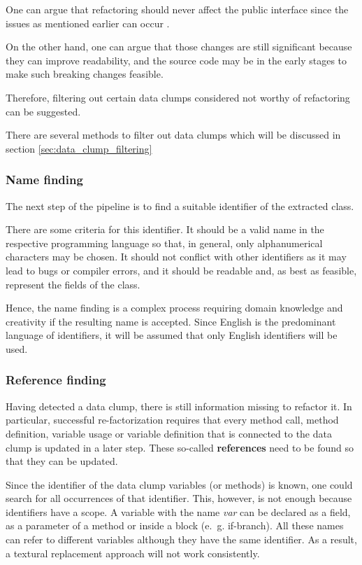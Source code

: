 One can argue that refactoring should never affect the public interface since the issues as mentioned earlier can occur \cite{10.1145/1352678.1352681}.

On the other hand, one can argue that those changes are still significant because they can improve readability, and the source code may be in the early stages to make such breaking changes feasible. 

Therefore, filtering out certain data clumps considered not worthy of refactoring can be suggested.

There are several methods to filter out data clumps which will be discussed in section \ref{sec:data_clump_filtering}

\subsubsection{Name finding}\label{subsec:chap3_data_clump_name_finding}
The next step of the pipeline is to find a suitable identifier of the extracted class.

There are some criteria for this identifier. It should be a valid name in the respective programming language so that, in general, only alphanumerical characters may be chosen. It should not conflict with other identifiers as it may lead to bugs or compiler errors, and it should be readable and, as best as feasible, represent the fields of the class.

Hence, the name finding is a complex process requiring domain knowledge and creativity if the resulting name is accepted. 
Since English is the predominant language of identifiers, it will be assumed that only English identifiers will be used. 

\subsubsection{Reference finding}
 Having detected a data clump, there is still information missing to refactor it. In particular, successful re-factorization requires that every method call, method definition, variable usage or variable definition that is connected to the data clump is updated in a later step. These so-called \textbf{references} need to be found so that they can be updated.

Since the identifier of the data clump variables (or methods) is known, one could search for all occurrences of that identifier. This, however, is not enough because identifiers have a scope. A variable with the name \textit{var} can be declared as a field, as a parameter of a method or inside a block (e.~g. if-branch). All these names can refer to different variables although they have the same identifier. As a result, a textural replacement approach will not work consistently.

